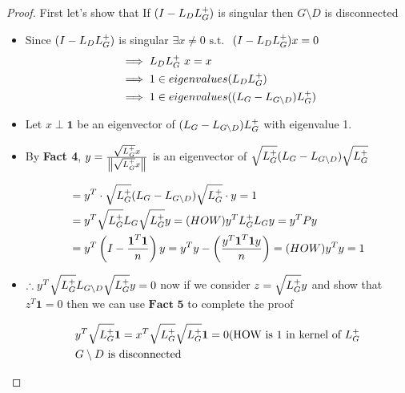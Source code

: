 \begin{proof}



 First let's show that If $(I - L_DL_{G}^{+})$ is singular then $G \setminus D$ is disconnected 
 
 \begin{itemize}
  \item Since $(I - L_DL_{G}^{+})$ is singular $\exists x \neq 0 \text{ s.t. }$ $(I - L_DL_{G}^{+})x = 0$
  \begin{alignat}{1}
   & \implies L_D L_{G}^{+} \ x = x \\
   & \implies 1 \in eigenvalues(L_DL_{G}^{+}) \\
   & \implies 1 \in eigenvalues((L_G - L_{G \setminus D}) L_{G}^{+}) 
  \end{alignat}
  
  \item Let $x \perp \textbf{1}$ be an eigenvector of $(L_G - L_{G \setminus D}) L_{G}^{+}$ with eigenvalue 1.
  \item By \textbf{Fact 4}, $y = \frac{\sqrt{L_{G}^{+}} x}{\left\lVert\sqrt{L_{G}^{+}}x\right\rVert}$ is an eigenvector of $\sqrt{L_{G}^{+}} (L_G - L_{G \setminus D}) \sqrt{L_{G}^{+}}$

\begin{alignat}{1}
   & = y^T \cdot \sqrt{L_{G}^{+}} (L_G - L_{G \setminus D}) \sqrt{L_{G}^{+}} \cdot y = 1 \\
   & = y^T \sqrt{L_{G}^{+}} L_G \sqrt{L_{G}^{+}} y = (HOW) y^T L_{G}^{+} L_G y = y^T P y  \\
   & = y^T  \left( I - \frac{\textbf{1}^T \textbf{1}}{n} \right) y = y^T y - \left( \frac{y^T \textbf{1}^T \textbf{1} y}{n} \right) = (HOW) y^T y = 1 
\end{alignat}

    \item $\therefore  y^T \sqrt{L_{G}^{+}} L_{G \setminus D} \sqrt{L_{G}^{+}} y = 0$ now if we consider $z = \sqrt{L_{G}^{+}} y$ and show that $z^T \textbf{1} = 0$ then we can use $\textbf{Fact 5}$ to complete the proof
    
    \begin{alignat}{1}
     &  y^T \sqrt{L_{G}^{+}} \textbf{1} = x^T \sqrt{L_{G}^{+}} \sqrt{L_{G}^{+}} \textbf{1} = 0 \text{(HOW is 1 in kernel of } L_{G}^{+} \\ 
     &  G \setminus D \text{ is disconnected}
    \end{alignat}

  
 \end{itemize} 


\end{proof}
